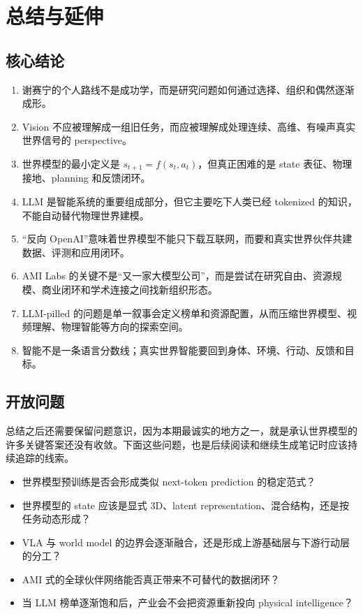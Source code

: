 \section{总结与延伸}

\subsection{核心结论}

\begin{enumerate}
\item 谢赛宁的个人路线不是成功学，而是研究问题如何通过选择、组织和偶然逐渐成形。
\item Vision 不应被理解成一组旧任务，而应被理解成处理连续、高维、有噪声真实世界信号的 perspective。
\item 世界模型的最小定义是 $s_{t+1}=f(s_t,a_t)$，但真正困难的是 state 表征、物理接地、planning 和反馈闭环。
\item LLM 是智能系统的重要组成部分，但它主要吃下人类已经 tokenized 的知识，不能自动替代物理世界建模。
\item “反向 OpenAI”意味着世界模型不能只下载互联网，而要和真实世界伙伴共建数据、评测和应用闭环。
\item AMI Labs 的关键不是“又一家大模型公司”，而是尝试在研究自由、资源规模、商业闭环和学术连接之间找新组织形态。
\item LLM-pilled 的问题是单一叙事会定义榜单和资源配置，从而压缩世界模型、视频理解、物理智能等方向的探索空间。
\item 智能不是一条语言分数线；真实世界智能要回到身体、环境、行动、反馈和目标。
\end{enumerate}

\subsection{开放问题}

总结之后还需要保留问题意识，因为本期最诚实的地方之一，就是承认世界模型的许多关键答案还没有收敛。下面这些问题，也是后续阅读和继续生成笔记时应该持续追踪的线索。

\begin{itemize}
\item 世界模型预训练是否会形成类似 next-token prediction 的稳定范式？
\item 世界模型的 state 应该是显式 3D、latent representation、混合结构，还是按任务动态形成？
\item VLA 与 world model 的边界会逐渐融合，还是形成上游基础层与下游行动层的分工？
\item AMI 式的全球伙伴网络能否真正带来不可替代的数据闭环？
\item 当 LLM 榜单逐渐饱和后，产业会不会把资源重新投向 physical intelligence？
\end{itemize}

